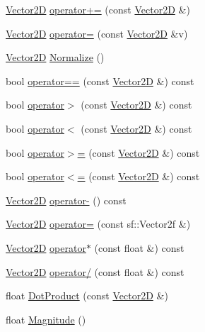 \begin{DoxyCompactItemize}
\item 
\hyperlink{class_vector2_d}{Vector2D} \hyperlink{class_vector2_d_a1e0134bc5942c384eb6f6a6c7b7ab62c}{operator+=} (const \hyperlink{class_vector2_d}{Vector2D} \&)
\item 
\hyperlink{class_vector2_d}{Vector2D} \hyperlink{class_vector2_d_af4f02654807e191cd084d2795b2037ce}{operator=} (const \hyperlink{class_vector2_d}{Vector2D} \&v)
\item 
\hyperlink{class_vector2_d}{Vector2D} \hyperlink{class_vector2_d_af699c21f9bd8ac3a30c6defa171ca94d}{Normalize} ()
\item 
bool \hyperlink{class_vector2_d_a85f309a7b1e82760d2524b7cc8896ef7}{operator==} (const \hyperlink{class_vector2_d}{Vector2D} \&) const
\item 
bool \hyperlink{class_vector2_d_afd5e33bd705b64c6b5d9dc02ff210a65}{operator$>$} (const \hyperlink{class_vector2_d}{Vector2D} \&) const
\item 
bool \hyperlink{class_vector2_d_aa6e719e5a3b752156bbe6879c7ae57d5}{operator$<$} (const \hyperlink{class_vector2_d}{Vector2D} \&) const
\item 
bool \hyperlink{class_vector2_d_a5f4ccbfffd4e05947cae418a5c038352}{operator$>$=} (const \hyperlink{class_vector2_d}{Vector2D} \&) const
\item 
bool \hyperlink{class_vector2_d_a3be8fe1d7c8f70e14fd2cc65a49b9b22}{operator$<$=} (const \hyperlink{class_vector2_d}{Vector2D} \&) const
\item 
\hyperlink{class_vector2_d}{Vector2D} \hyperlink{class_vector2_d_af2f279f4de17d3d3ae69b476cf6ac945}{operator-\/} () const
\item 
\hyperlink{class_vector2_d}{Vector2D} \hyperlink{class_vector2_d_a8eba32059605848ce2357b57ec903e06}{operator=} (const sf\+::\+Vector2f \&)
\item 
\hyperlink{class_vector2_d}{Vector2D} \hyperlink{class_vector2_d_ab4f9db2da060af72008c10622efb07bd}{operator$\ast$} (const float \&) const
\item 
\hyperlink{class_vector2_d}{Vector2D} \hyperlink{class_vector2_d_a48e182885509ad31beb12ebda25fdbae}{operator/} (const float \&) const
\item 
float \hyperlink{class_vector2_d_a4c09243b446e694ef66788eeadd14627}{Dot\+Product} (const \hyperlink{class_vector2_d}{Vector2D} \&)
\item 
float \hyperlink{class_vector2_d_afaa1e7b4e83f8e407dc83837349febe3}{Magnitude} ()
\end{DoxyCompactItemize}
